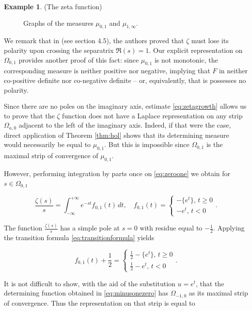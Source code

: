 \documentclass[12pt]{article}
\theoremstyle{definition}
\newtheorem{example}[theorem]{Example}
\begin{document}
\begin{example}{(The zeta function)}
\begin{figure}[h]
\begin{subfigure}[t]{0.48\textwidth}
\begin{tikzpicture}[scale=0.9]
\end{tikzpicture}
\end{subfigure}

\caption{Graphs of the measures $\mu_{0,1}$ and $\mu_{1,\infty}$.}
\end{figure}


We remark that in \cite{BuescuPolar} (see section 4.5), the authors proved that $\zeta$ must lose its polarity upon crossing the separatrix $\Re(s)=1.$ Our explicit representation on $\Omega_{0,1}$ provides another proof of this fact: since $\mu_{0,1}$ is not monotonic,  the corresponding measure is neither positive nor negative, implying that $F$ in neither co-positive definite nor co-negative definite -- or, equivalently, that is possesses no polarity.

Since there are no poles on the imaginary axis, estimate \eqref{eq:zetagrowth} allows us  to prove that the $\zeta$ function does not have a Laplace representation on any strip \(\Omega_{a,0}\) adjacent to the left of the imaginary axis.
Indeed, if that were the case, direct application of
Theorem \ref{thm:hol} shows that  its determining measure would necessarily be equal to $\mu_{0,1}$. But this is impossible  since $\Omega_{0,1}$ is the maximal strip of convergence of $\mu_{0,1}$. 

However, performing integration by parts once on \eqref{eq:zeroone} we obtain for $s \in \Omega_{0,1}$

\begin{equation}\label{eq:zetasobres01}
    \frac{\zeta(s)}{s}= \int_{-\infty}^{+ \infty}e^{-st}f_{0,1}(t)\,dt, \quad f_{0,1}(t)=\begin{cases}
         - \{e^t \}, \, t \geq 0 \\
    -e^t, \, t<0
    \end{cases}.
\end{equation}

The function \(\frac{\zeta(s)}{s}\) has a simple pole at $s=0$ with residue equal to \(-\frac{1}{2}.\) Applying the transition formula \eqref{eq:transitionformula} yields

\begin{equation}\label{eq:minusonezero}f_{0,1}(t)+\frac{1}{2}= \begin{cases}
    \frac{1}{2}- \{e^t \}, \, t \geq 0 \\
    \frac{1}{2}-e^t, \, t<0
\end{cases}.\end{equation}

It is not difficult to show, with the aid of the substitution \(u=e^t\), that the determining  function obtained in \eqref{eq:minusonezero} has \(\Omega_{-1,0}\) as its maximal strip of convergence. Thus the representation on that strip is equal to


\end{example}
\end{document}
